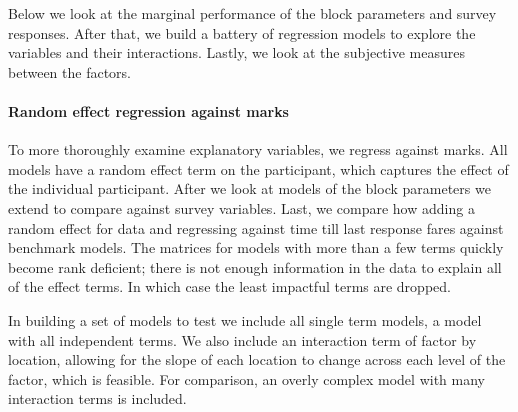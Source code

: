 \documentclass{template/monashthesis}
\begin{document}
Below we look at the marginal performance of the block parameters and survey responses. After that, we build a battery of regression models to explore the variables and their interactions. Lastly, we look at the subjective measures between the factors.

\hypertarget{random-effect-regression-against-marks}{%
\paragraph{Random effect regression against marks}\label{random-effect-regression-against-marks}}

To more thoroughly examine explanatory variables, we regress against marks. All models have a random effect term on the participant, which captures the effect of the individual participant. After we look at models of the block parameters we extend to compare against survey variables. Last, we compare how adding a random effect for data and regressing against time till last response fares against benchmark models. The matrices for models with more than a few terms quickly become rank deficient; there is not enough information in the data to explain all of the effect terms. In which case the least impactful terms are dropped.

In building a set of models to test we include all single term models, a model with all independent terms. We also include an interaction term of factor by location, allowing for the slope of each location to change across each level of the factor, which is feasible. For comparison, an overly complex model with many interaction terms is included.
\end{document}
